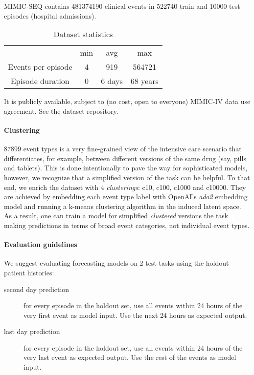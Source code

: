 MIMIC-SEQ contains 481374190 clinical events in 522740 train and 10000 test episodes (hospital admissions).

\begin{table}[H]
    \centering
    \begin{tabular}{c|c|c|c}
         & min & avg & max \\
         Events per episode & 4 & 919 & 564721 \\
         Episode duration & 0 & 6 days & 68 years \\
    \end{tabular}
    \caption{Dataset statistics}
    \label{tab:stats}
\end{table}

It is publicly available, subject to (no cost, open to everyone) MIMIC-IV data use agreement.
See the dataset repository.

\paragraph{Clustering}

87899 event types is a very fine-grained view of the intensive care scenario that differentiates, for example, between different versions of the same drug (say, pills and tablets).
This is done intentionally to pave the way for sophisticated models, however, we recognize that a simplified version of the task can be helpful.
To that end, we enrich the dataset with 4 \emph{clusterings}: c10, c100, c1000 and c10000.
They are achieved by embedding each event type label with OpenAI's \emph{ada2} embedding model and running a k-means clustering algorithm in the induced latent space.
As a result, one can train a model for simplified \emph{clustered} versions the task making predictions in terms of broad event categories, not individual event types.

\paragraph{Evaluation guidelines}

We suggest evaluating forecasting models on 2 test tasks using the holdout patient histories:
\begin{description}
    \item[second day prediction] for every episode in the holdout set, use all events within 24 hours of the very first event as model input. Use the next 24 hours as expected output.
    \item[last day prediction] for every episode in the holdout set, use all events within 24 hours of the very last event as expected output. Use the rest of the events as model input. 
\end{description}

